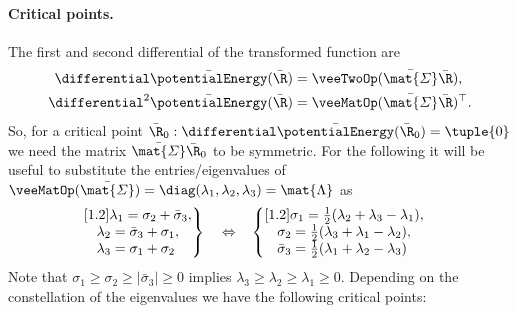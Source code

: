 \paragraph{Critical points.}
The first and second differential of the transformed function are
\begin{align}
 \differential \bar{\potentialEnergy}(\bar{\R}) &= \veeTwoOp(\bar{\mat{\varSigma}} \bar{\R}),
\\
 \differential^2 \bar{\potentialEnergy}(\bar{\R}) &= \veeMatOp(\bar{\mat{\varSigma}} \bar{\R})^\top.
\end{align}
So, for a critical point $\bar{\R}_0 : \differential \bar{\potentialEnergy}(\bar{\R}_0)=\tuple{0}$ we need the matrix $\bar{\mat{\varSigma}} \bar{\R}_0$ to be symmetric.
For the following it will be useful to substitute the entries/eigenvalues of $\veeMatOp(\bar{\mat{\varSigma}}) = \diag(\lambda_1, \lambda_2, \lambda_3) = \mat{\Lambda}$ as
\begin{align}
 &\left.\begin{matrix}[1.2]
 \lambda_1 = \sigma_2 + \bar{\sigma}_3, \\
 \lambda_2 = \bar{\sigma}_3 + \sigma_1, \\
 \lambda_3 = \sigma_1 + \sigma_2\hphantom{,}  
 \end{matrix}\right\}&
&\Leftrightarrow&
 &\left\{\begin{matrix}[1.2]
 \sigma_1 = \tfrac{1}{2} (\lambda_2 + \lambda_3 - \lambda_1), \\
 \sigma_2 = \tfrac{1}{2} (\lambda_3 + \lambda_1 - \lambda_2), \\
 \bar{\sigma}_3 = \tfrac{1}{2} (\lambda_1 + \lambda_2 - \lambda_3)\hphantom{,}  
 \end{matrix}\right.
\end{align} 
Note that $\sigma_1 \geq \sigma_2 \geq |\bar{\sigma}_3| \geq 0$ implies $\lambda_3 \geq \lambda_2 \geq \lambda_1 \geq 0$.
Depending on the constellation of the eigenvalues we have the following critical points:
